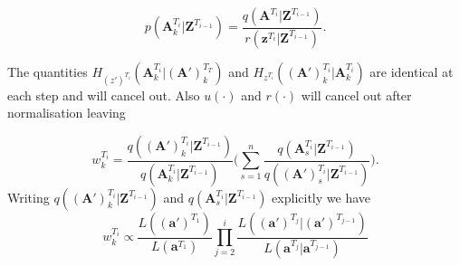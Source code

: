 \documentclass[11pt,a4paper]{article}
\renewcommand{\vec}[1]{\mathbf{#1}}
\begin{document}
\begin{equation*}
    p(\vec{A}^{T_i}_k | \vec{Z}^{T_{i-1}}) = \frac{q(\vec{A}^{T_i} | \vec{Z}^{T_{i-1}})}{r(\vec{z}^{T_i}| \vec{Z}^{T_{i-1}})}.
\end{equation*}

The quantities $H_{(z')^{T_i}} (\vec{A}^{T_i}_k | \vec{(A')}^{T_T}_k)$ and $H_{z^{T_i}} (\vec{(A')}^{T_i}_k | \vec{A}^{T_i}_k)$ are identical at each step and will cancel out. Also $u(\cdot)$ and $r(\cdot)$ will cancel out after normalisation leaving

\begin{equation*}
    w^{T_i}_k = \frac{q(\vec{(A')}^{T_i}_k | \vec{Z}^{T_{i-1}})}{q(\vec{A}^{T_i}_k | \vec{Z}^{T_{i-1}})} \Bigg( \sum_{s=1}^n \frac{q(\vec{A}^{T_i}_s | \vec{Z}^{T_{i-1}})}{q(\vec{(A')}^{T_i}_s | \vec{Z}^{T_{i-1}})} \Bigg).
\end{equation*}
Writing $q(\vec{(A')}^{T_i}_k | \vec{Z}^{T_{i-1}})$ and $q(\vec{A}^{T_i}_s | \vec{Z}^{T_{i-1}})$ explicitly we have
\begin{equation*}
    w^{T_i}_k \propto \frac{L((\vec{a}')^{T_1})}{L(\vec{a}^{T_1})} \prod_{j=2}^{i} \frac{L((\vec{a}')^{T_j} | (\vec{a}')^{T_{j-1}})}{L(\vec{a}^{T_j} | \vec{a}^{T_{j-1}})} 
\end{equation*}

\appendix
\end{document}
